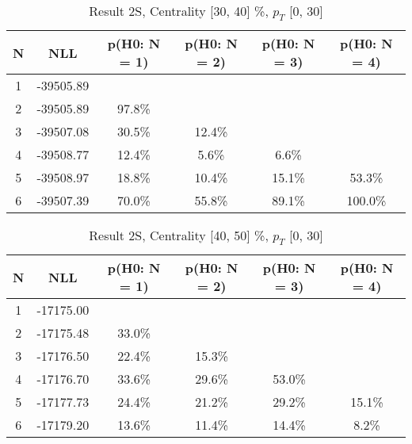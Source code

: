 \begin{table}[htb]
	\begin{center}
	\caption{Result 2S, Centrality [30, 40] \%, $p_{T}$ [0, 30] \GeV
}
{\footnotesize\renewcommand{\arraystretch}{1.4}
		\begin{tabular}{cc||>{\columncolor[gray]{0.8}}cccc}
			N & NLL & p(H0: N = 1) & p(H0: N = 2) & p(H0: N = 3) & p(H0: N = 4)\\ 
		\hline
1 & -39505.89 & & & & \\
2 & -39505.89 & 97.8\% & & & \\
3 & -39507.08 & 30.5\% & 12.4\% & & \\
4 & -39508.77 & 12.4\% & 5.6\% & 6.6\% & \\
5 & -39508.97 & 18.8\% & 10.4\% & 15.1\% & 53.3\% \\
6 & -39507.39 & 70.0\% & 55.8\% & 89.1\% & 100.0\% \\
	\end{tabular}
		\label{tab:lab}
	}
	\end{center}\end{table}

\begin{table}[htb]
	\begin{center}
	\caption{Result 2S, Centrality [40, 50] \%, $p_{T}$ [0, 30] \GeV
}
{\footnotesize\renewcommand{\arraystretch}{1.4}
		\begin{tabular}{cc||>{\columncolor[gray]{0.8}}cccc}
			N & NLL & p(H0: N = 1) & p(H0: N = 2) & p(H0: N = 3) & p(H0: N = 4)\\ 
		\hline
1 & -17175.00 & & & & \\
2 & -17175.48 & 33.0\% & & & \\
3 & -17176.50 & 22.4\% & 15.3\% & & \\
4 & -17176.70 & 33.6\% & 29.6\% & 53.0\% & \\
5 & -17177.73 & 24.4\% & 21.2\% & 29.2\% & 15.1\% \\
6 & -17179.20 & 13.6\% & 11.4\% & 14.4\% & 8.2\% \\
	\end{tabular}
		\label{tab:lab}
	}
	\end{center}\end{table}

